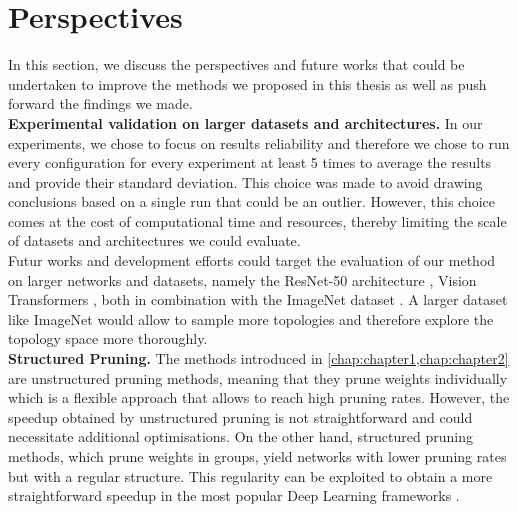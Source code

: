 \section{Perspectives}

In this section, we discuss the perspectives and future works that could be
undertaken to improve the methods we proposed in this thesis as well as push
forward the findings we made.\\

\noindent \textbf{Experimental validation on larger datasets and architectures.}
In our experiments, we chose to focus on results reliability and therefore we
chose to run every configuration for every experiment at least 5 times to
average the results and provide their standard deviation. This choice was made
to avoid drawing conclusions based on a single run that could be an outlier.
However, this choice comes at the cost of computational time and resources,
thereby limiting the scale of datasets and architectures we could evaluate.\\

Futur works and development efforts could target the evaluation of our method on
larger networks and datasets, namely the ResNet-50 architecture
\cite{DBLP:conf/cvpr/HeZRS16}, Vision Transformers
\cite{DBLP:conf/iclr/DosovitskiyB0WZ21}, both in combination with the ImageNet
dataset \cite{DBLP:journals/ijcv/RussakovskyDSKS15}. A larger dataset like
ImageNet would allow to sample more topologies and therefore explore the
topology space more thoroughly.\\

\noindent \textbf{Structured Pruning.} The methods introduced in
\cref{chap:chapter1,chap:chapter2} are unstructured pruning methods, meaning
that they prune weights individually which is a flexible approach that allows to
reach high pruning rates. However, the speedup obtained by unstructured pruning
is not straightforward and could necessitate additional optimisations. On the
other hand, structured pruning methods, which prune weights in groups, yield
networks with lower pruning rates but with a regular structure. This regularity
can be exploited to obtain a more straightforward speedup in the most popular
Deep Learning frameworks
\cite{DBLP:conf/nips/PaszkeGMLBCKLGA19,DBLP:journals/corr/AbadiABBCCCDDDG16}.\\

